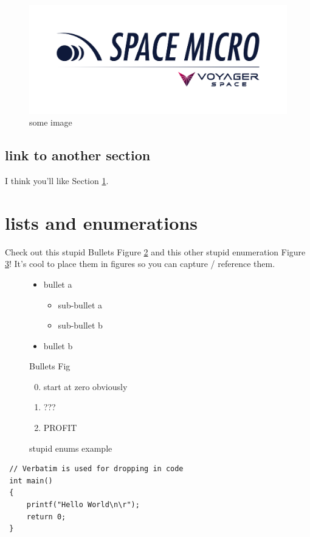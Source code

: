 \documentclass[oneside,english,chapters]{smireport}
\begin{document}
\begin{figure}
  \begin{center}\includegraphics[width=0.25\columnwidth,height=0.25\textheight,keepaspectratio]{./images/smi-logo.png}\end{center}
\caption{some image}\label{fig:image}
\end{figure}

\subsection{link to another section}
I think you'll like Section \ref{sec:landn}.

\section{lists and enumerations}
\label{sec:landn}

Check out this stupid Bullets Figure \ref{fig:bullets} and this other stupid enumeration Figure \ref{fig:enum}!
It's cool to place them in figures so you can capture / reference them.

\begin{figure}[H] %
\begin{itemize}
  \item bullet a
  \begin{itemize}
    \item sub-bullet a
    \item sub-bullet b
  \end{itemize}
  \item bullet b
\end{itemize}
\caption{Bullets Fig}\label{fig:bullets}
\end{figure}

\begin{figure}
\begin{enumerate}
  \setcounter{enumi}{-1} %
  \item start at zero obviously
  \item ???
  \item PROFIT
\end{enumerate}
\caption{stupid enums example}\label{fig:enum}
\end{figure}

\begin{verbatim}
 // Verbatim is used for dropping in code
 int main()
 {
     printf("Hello World\n\r");
     return 0;
 }
\end{verbatim}


\end{document}
